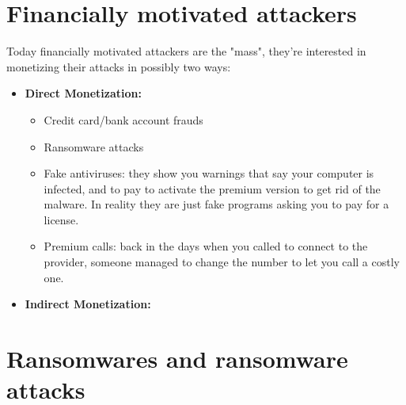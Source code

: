     \section{Financially motivated attackers}
        Today financially motivated attackers are the "mass", they're interested in monetizing their attacks in possibly two ways:
        \begin{itemize}
            \item \textbf{Direct Monetization:}
                \begin{itemize}
                    \item Credit card/bank account frauds
                    \item Ransomware attacks 
                    \item Fake antiviruses: they show you warnings that say your computer is infected, and to pay to activate the premium version to get rid of the malware. In reality they are just fake programs asking you to pay for a license.
                    \item Premium calls: back in the days when you called to connect to the provider, someone managed to change the number to let you call a costly one.
                \end{itemize} 
            \item \textbf{Indirect Monetization:}
        \end{itemize}
    \section{Ransomwares and ransomware attacks}
